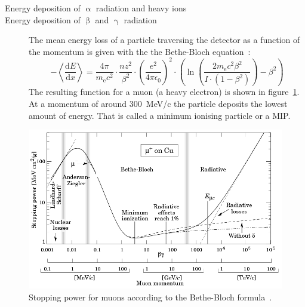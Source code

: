 \begin{description}
\item[Energy deposition of $\upalpha$ radiation and heavy ions]
\item[Energy deposition of  $\upbeta$ and $\upgamma$ radiation] The mean energy loss of a particle traversing the detector as a function of the momentum is given with the the Bethe-Bloch equation~\cite{}: 
\begin{equation}
-\left\langle\frac{\mathrm{d}E}{\mathrm{d}x}\right\rangle = \frac{4\pi}{m_\mathrm{e}c^2}  \cdot \frac{nz^2}{\beta^2}  \cdot  \left(\frac{e^2}{4\pi\epsilon_\mathrm{0}}\right)^2  \cdot  \left( \ln \left(\frac{2m_\mathrm{e}c^2\beta^2}{I\cdot(1-\beta^2)}\right)-\beta^2  \right)
\label{eq:bethebloch}
\end{equation}
The resulting function for a muon (a heavy electron) is shown in figure~\ref{fig:bb2}. At a momentum of around 300~MeV/c the particle deposits the lowest amount of energy. That is called a minimum ionising particle or a MIP.
\end{description}


\begin{figure}[!t]
\begin{center}
\includegraphics[width=0.85\linewidth]{02_pulse_formation/pics/bb2}
\caption{Stopping power for muons according to the Bethe-Bloch formula~\cite{}.}
\label{fig:bb2}
\end{center}
\end{figure}


